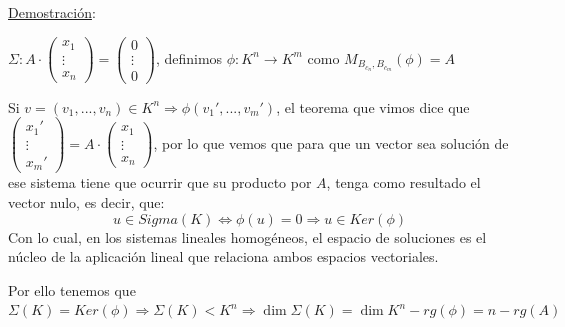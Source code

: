 \documentclass[10pt,a4paper,openright]{book}
\begin{document}
\underline{Demostración}:\par
$\Sigma: A\cdot \begin{pmatrix}
x_1 \\ \vdots \\ x_n
\end{pmatrix}=\begin{pmatrix}
0 \\ \vdots \\ 0
\end{pmatrix}$, definimos $\phi: K^n \longrightarrow K^m$ como $M_{B_{c_n}, B_{c_m}}(\phi)=A$

Si $v=(v_1, ..., v_n)\in K^n\Rightarrow \phi(v_1', ..., v_m')$, el teorema que vimos dice que $\begin{pmatrix}
x_1' \\ \vdots \\ x_m'
\end{pmatrix}=A\cdot \begin{pmatrix}
x_1 \\ \vdots \\ x_n
\end{pmatrix}$, por lo que vemos que para que un vector sea solución de ese sistema tiene que ocurrir que su producto por $A$, tenga como resultado el vector nulo, es decir, que:
$$u\in Sigma (K)\Leftrightarrow \phi(u)=0\Rightarrow u\in Ker(\phi)$$
Con lo cual, en los sistemas lineales homogéneos, el espacio de soluciones es el núcleo de la aplicación lineal que relaciona ambos espacios vectoriales. 

Por ello tenemos que $\Sigma(K)=Ker(\phi)\Rightarrow \Sigma(K)< K^n\Rightarrow \dim \Sigma(K)=\dim K^n- rg(\phi)=n-rg(A)$
\end{document}
